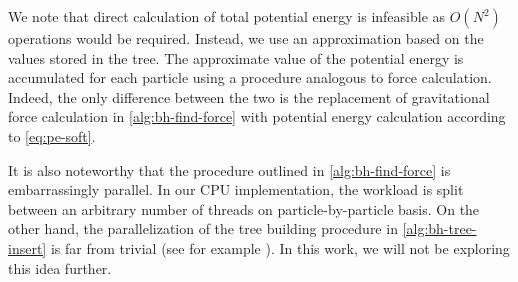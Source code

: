 We note that direct calculation of total potential energy is infeasible as $O(N^2)$ operations would be required.
Instead, we use an approximation based on the values stored in the tree.
The approximate value of the potential energy is accumulated for each particle using a procedure analogous to force calculation.
Indeed, the only difference between the two is the replacement of gravitational force calculation in \autoref{alg:bh-find-force} with potential energy calculation according to \autoref{eq:pe-soft}.

It is also noteworthy that the procedure outlined in \autoref{alg:bh-find-force} is embarrassingly parallel.
In our CPU implementation, the workload is split between an arbitrary number of threads on particle-by-particle basis.
On the other hand, the parallelization of the tree building procedure in \autoref{alg:bh-tree-insert} is far from trivial (see for example \cite{warren_salmon_1993}).
In this work, we will not be exploring this idea further.